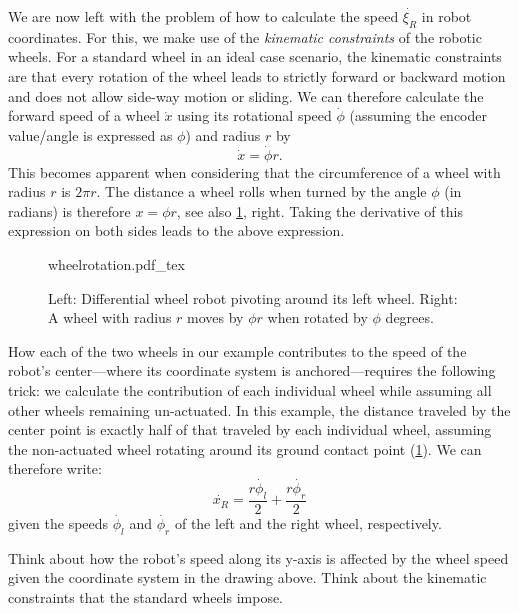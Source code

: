 We are now left with the problem of how to calculate the speed $ \dot{\xi_R}$ in robot coordinates. For this, we make use of the \emph{kinematic constraints} of the robotic wheels.
For a standard wheel in an ideal case scenario, the kinematic constraints are that every rotation of the wheel leads to strictly forward or backward motion and does not allow side-way motion or sliding. We can therefore calculate the forward speed of a wheel $ \dot{x}$ using its rotational speed $ \dot{\phi}$ (assuming the encoder value/angle is expressed as $ \phi$) and radius $ r$ by
\begin{equation}
\dot{x}=\dot{\phi}r.
\end{equation}
This becomes apparent when considering that the circumference of a wheel with radius $r$ is $2\pi r$. The distance a wheel rolls when turned by the angle $ \phi$ (in radians) is therefore $ x=\phi r$, see also \cref{fig:wheelrotation}, right. Taking the derivative of this expression on both sides leads to the above expression.

\begin{figure}[htb!]
    \centering
    \def\svgwidth{0.86\textwidth}
    {wheelrotation.pdf_tex}
    \caption{Left: Differential wheel robot pivoting around its left wheel. Right: A wheel with radius $r$ moves by $\phi r$ when rotated by $\phi$ degrees.}
    \label{fig:wheelrotation}
\end{figure}



How each of the two wheels in our example contributes to the speed of the robot's center---where its coordinate system is anchored---requires the following trick: we calculate the contribution of each individual wheel while assuming all other wheels remaining un-actuated.
In this example, the distance traveled by the center point is exactly half of that traveled by each individual wheel, assuming the non-actuated wheel rotating around its ground contact point (\cref{fig:wheelrotation}). We can therefore write:
\begin{equation}
\dot{x_R}=\frac{r\dot{\phi_l}}{2}+\frac{r\dot{\phi_r}}{2}
\end{equation}
given the speeds $ \dot{\phi_l}$ and $ \dot{\phi_r}$ of the left and the right wheel, respectively.

\begin{framed}
Think about how the robot's speed along its y-axis is affected by the wheel speed given the coordinate system in the drawing above. Think about the kinematic constraints that the standard wheels impose.
\end{framed}

